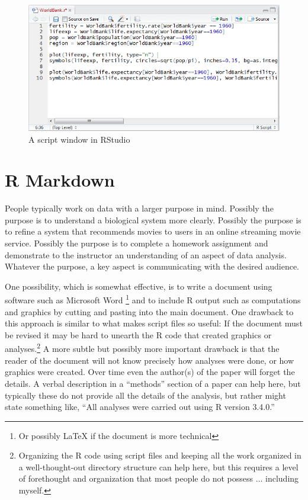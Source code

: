 \documentclass[
]{krantz}
\begin{document}
\begin{figure}
\includegraphics[width=1\linewidth]{../figures/ScriptWindow} \caption{A script window in RStudio}\label{fig:script}
\end{figure}

\hypertarget{r-markdown}{%
\section{R Markdown}\label{r-markdown}}

People typically work on data with a larger purpose in mind. Possibly the purpose is to understand a biological system more clearly. Possibly the purpose is to refine a system that recommends movies to users in an online streaming movie service. Possibly the purpose is to complete a homework assignment and demonstrate to the instructor an understanding of an aspect of data analysis. Whatever the purpose, a key aspect is communicating with the desired audience.

One possibility, which is somewhat effective, is to write a document using software such as Microsoft Word \footnote{Or possibly LaTeX if the document is more technical} and to include R output such as computations and graphics by cutting and pasting into the main document. One drawback to this approach is similar to what makes script files so useful: If the document must be revised it may be hard to unearth the R code that created graphics or analyses.\footnote{Organizing the R code using script files and keeping all the work organized in a well-thought-out directory structure can help here, but this requires a level of forethought and organization that most people do not possess \(\ldots\) including myself.} A more subtle but possibly more important drawback is that the reader of the document will not know precisely how analyses were done, or how graphics were created. Over time even the author(s) of the paper will forget the details. A verbal description in a ``methods'' section of a paper can help here, but typically these do not provide all the details of the analysis, but rather might state something like, ``All analyses were carried out using R version 3.4.0.''
\end{document}
